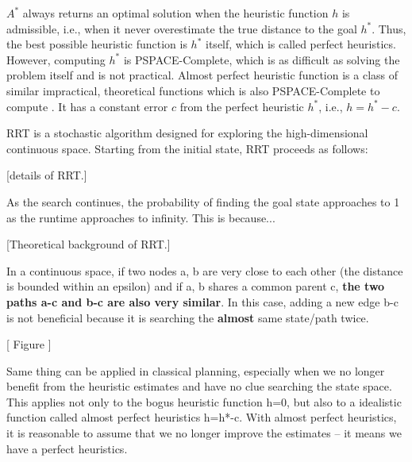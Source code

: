 
$A^*$ always returns an optimal solution when the heuristic function $h$ is
admissible, i.e., when it never overestimate the true distance to the goal
$h^*$. Thus, the best possible heuristic function is $h^*$ itself, which is
called perfect heuristics. However, computing $h^*$ is PSPACE-Complete,
which is as difficult as solving the problem itself and is not
practical. Almost perfect heuristic function is a class of similar
impractical, theoretical functions which is also PSPACE-Complete to compute \cite{helmert2008good}.
It has a constant error $c$ from the perfect heuristic $h^*$, i.e., $h=h^*-c$.


RRT is a stochastic algorithm designed for exploring the high-dimensional continuous space.
Starting from the initial state, RRT proceeds as follows:

[details of RRT.]

As the search continues, the probability of finding the goal state approaches to 1 as the runtime approaches to infinity. This is because...

[Theoretical background of RRT.]

In a continuous space,
if two nodes a, b are very close to each other (the distance is bounded within an epsilon)
and if a, b shares a common parent c,
\textbf{the two paths a-c and b-c are also very similar}.
In this case, adding a new edge b-c is
not beneficial because it is searching the \textbf{almost} same state/path twice.

[ Figure ]



Same thing can be applied in classical planning, especially when we no
longer benefit from the heuristic estimates and have no clue searching the
state space.
This applies not only to the bogus heuristic function h=0, but also to a idealistic
function called almost perfect heuristics h=h*-c. With almost perfect
heuristics, it is reasonable to assume that we no longer improve the
estimates -- it means we have a perfect heuristics.

